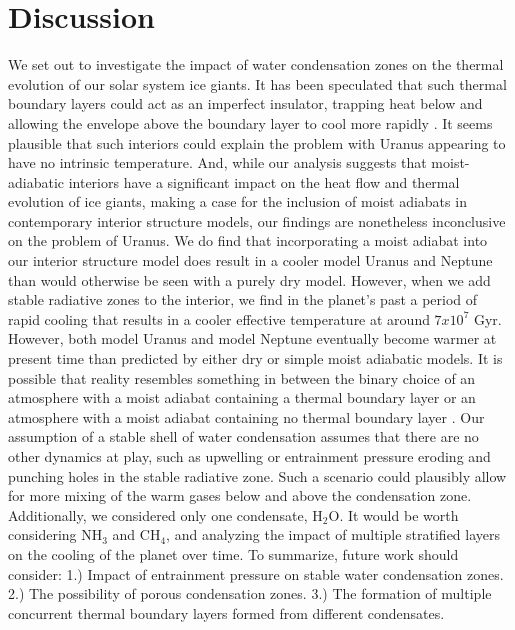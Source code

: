 \documentclass[11pt]{ucscthesisbs}
\begin{document}
\chapter{Discussion}
We set out to investigate the impact of water condensation zones on the thermal evolution of our solar system ice giants. It has been speculated that such thermal boundary layers could act as an imperfect insulator, trapping heat below and allowing the envelope above the boundary layer to cool more rapidly \citep{nettelmann_2016}\citep{friedson_2017}\citep{leconte_2017}\citep{podolak_1991}\citep{scheibe_2019}. It seems plausible that such interiors could explain the problem with Uranus appearing to have no intrinsic temperature. And, while our analysis suggests that moist-adiabatic interiors have a significant impact on the heat flow and thermal evolution of ice giants, making a case for the inclusion of moist adiabats in contemporary interior structure models, our findings are nonetheless inconclusive on the problem of Uranus. We do find that incorporating a moist adiabat into our interior structure model does result in a cooler model Uranus and Neptune than would otherwise be seen with a purely dry model. However, when we add stable radiative zones to the interior, we find in the planet's past a period of rapid cooling that results in a cooler effective temperature at around $7 x 10^7$ Gyr. However, both model Uranus and model Neptune eventually become warmer at present time than predicted by either dry or simple moist adiabatic models. It is possible that reality resembles something in between the binary choice of an atmosphere with a moist adiabat containing a thermal boundary layer or an atmosphere with a moist adiabat containing no thermal boundary layer \citep{guillot_2019}. Our assumption of a stable shell of water condensation assumes that there are no other dynamics at play, such as upwelling or entrainment pressure \citep{friedson_2017} eroding and punching holes in the stable radiative zone. Such a scenario could plausibly allow for more mixing of the warm gases below and above the condensation zone. Additionally, we considered only one condensate, H$_{2}$O. It would be worth considering NH$_{3}$ and CH$_{4}$, and analyzing the impact of multiple stratified layers on the cooling of the planet over time. To summarize, future work should consider: 1.) Impact of entrainment pressure on stable water condensation zones. 2.) The possibility of porous condensation zones. 3.) The formation of multiple concurrent thermal boundary layers formed from different condensates. 



\newcommand{\newblock}{}

\end{document}
